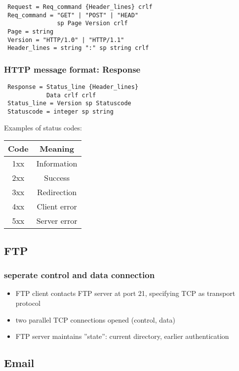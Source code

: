 \documentclass[10pt, a4paper, twocolumn]{scrartcl}
\begin{document}
\begin{verbatim}
 Request = Req_command {Header_lines} crlf
 Req_command = "GET" | "POST" | "HEAD"
               sp Page Version crlf
 Page = string
 Version = "HTTP/1.0" | "HTTP/1.1"
 Header_lines = string ":" sp string crlf
\end{verbatim}

\subsubsection{HTTP message format: Response}

\begin{verbatim}
 Response = Status_line {Header_lines} 
            Data crlf crlf
 Status_line = Version sp Statuscode
 Statuscode = integer sp string
\end{verbatim}

Examples of status codes:\\
\begin{tabular}{|c|c|}
	\hline
	\textbf{Code} &		\textbf{Meaning} \\ \hline
	1xx &			Information\\ \hline
	2xx &			Success\\ \hline
	3xx &			Redirection\\ \hline
	4xx &			Client error\\ \hline
	5xx &			Server error\\ \hline
\end{tabular}

\subsection{FTP}

\subsubsection{seperate control and data connection}

\begin{itemize}
	\item FTP client contacts FTP server at port 21, specifying TCP as transport protocol
	\item two parallel TCP connections opened (control, data)
	\item FTP server maintains ''state'': current directory, earlier authentication
\end{itemize}

\subsection{Email}
\end{document}
